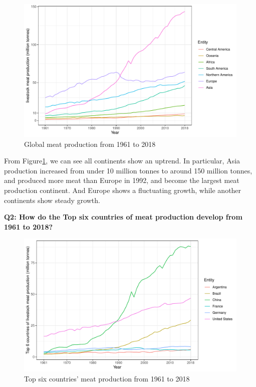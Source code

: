 \documentclass[11pt,a4paper,]{article}
\begin{document}
\begin{figure}
\centering
\includegraphics{report_files/figure-latex/continent-figure-1.pdf}
\caption{\label{fig:continent-figure}Global meat production from 1961 to 2018}
\end{figure}

From Figure\ref{fig:continent-figure}, we can see all continents show an uptrend. In particular, Asia production increased from under 10 million tonnes to around 150 million tonnes, and produced more meat than Europe in 1992, and become the largest meat production continent. And Europe shows a fluctuating growth, while another continents show steady growth.

\clearpage

\textbf{Q2: How do the Top six countries of meat production develop from 1961 to 2018?}

\begin{figure}
\centering
\includegraphics{report_files/figure-latex/country-1.pdf}
\caption{\label{fig:country}Top six countries' meat production from 1961 to 2018}
\end{figure}
\end{document}
